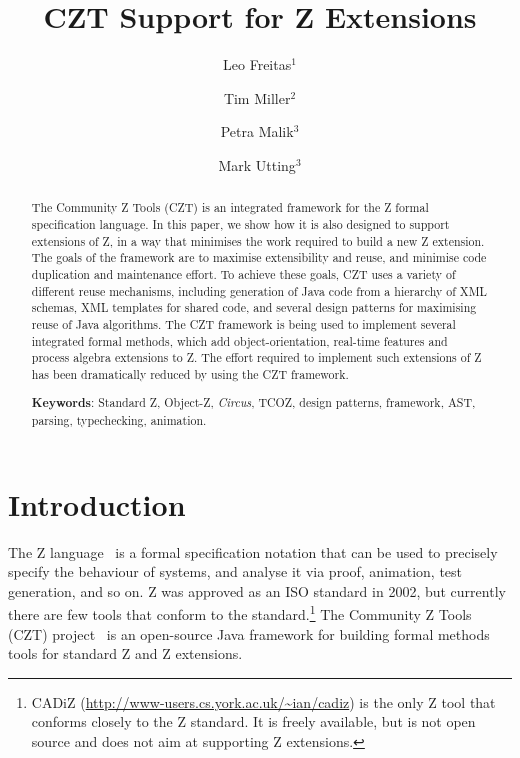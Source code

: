 \documentclass{llncs}
\newcommand{\Circus}{{\sf\slshape Circus}}
\begin{document}
\title{CZT Support for Z Extensions}
\author{Leo Freitas$^1$ \and Tim Miller$^2$ \and Petra Malik$^3$ \and Mark Utting$^3$}


\maketitle


\begin{abstract}
  The Community Z Tools (CZT) is an integrated
  framework for the Z formal specification language.  In this
  paper, we show how it is also designed to support extensions
  of Z, in a way that minimises the work required to build a
  new Z extension.  The goals of the framework are to maximise
  extensibility and reuse, and minimise code duplication and
  maintenance effort.  To achieve these goals, CZT uses a variety of
  different reuse mechanisms, including generation of Java
  code from a hierarchy of XML schemas, XML templates for shared
  code, and several design patterns for maximising reuse of Java
  algorithms.
  The CZT framework is being used to implement several integrated
  formal methods, which add object-orientation, real-time features
  and process algebra extensions to Z.  The effort required to
  implement such extensions of Z has been dramatically reduced
  by using the CZT framework.

  \noindent
  \textbf{Keywords}: Standard Z, Object-Z, \Circus, TCOZ, design patterns,
	 framework, AST, parsing, typechecking, animation.
\end{abstract}

\section{Introduction} \label{sec:intro}

  The Z language~\cite{isoz} is a formal specification notation that
  can be used to precisely specify the behaviour of systems, and
  analyse it via proof, animation, test generation, and so on.  
  Z was approved as an ISO standard in 2002, but currently there are few
  tools that conform to the standard.\footnote{CADiZ 
  (\url{http://www-users.cs.york.ac.uk/~ian/cadiz}) is the only Z tool
  that conforms closely to the Z standard.  It is freely available, 
  but is not open source and does not aim at supporting Z extensions.}
  The Community Z Tools (CZT) project~\cite{czt} is an open-source Java
  framework for building formal methods tools for standard Z and Z extensions.
\end{document}
